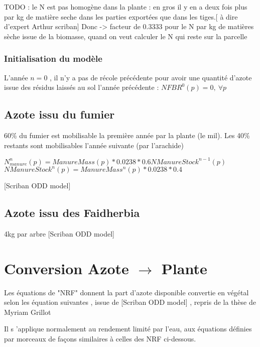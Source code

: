 \documentclass[10pt,a4paper,french]{article} %
\begin{document}
TODO : le N est pas homogène dans la plante : en gros il y en a deux fois plus par kg de matière seche dans les parties exportées que dans les tiges.[ à dire d'expert Arthur scriban]
Donc -> facteur de 0.3333 pour le N par kg de matières sèche  issue de la biomasse, quand on veut calculer le N qui reste sur la parcelle



\subsubsection{Initialisation du modèle}


L'année $n=0$ , il n'y a pas de récole précédente pour  avoir une quantité d'azote issue des résidus laissés au sol l'année précédente  : $NFBR^0(p)=0,\  \forall p$





\subsection{Azote issu du fumier}


60\% du fumier est mobilisable la première année par la plante (le mil).
Les 40\% restants sont mobilisables l'année suivante (par l'arachide)


$N_{manure}^n(p)= ManureMass(p) * 0.0238 * 0.6 NManureStock^{n-1}(p)$
$NManureStock^{n}(p) = ManureMass^n(p)*  0.0238 * 0.4 $




[Scriban ODD model]




\subsection{Azote issu des Faidherbia}


4kg par arbre [Scriban ODD model]





\section{Conversion Azote $\rightarrow$ Plante}



Les équations de "NRF" donnent la part d'azote disponible convertie en végétal selon les équation suivantes , issue de [Scriban ODD model]  , repris de la thèse de Myriam Grillot 


Il s 'applique normalement au rendement limité par l'eau,  aux équations définies par morceaux de façons similaires à celles des NRF  ci-dessous. 
\end{document}
